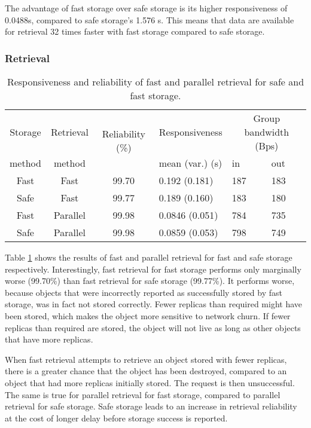 The advantage of fast storage over safe storage is its higher responsiveness of 0.0488s, compared to safe storage's 1.576 s. This means that data are available for retrieval 32 times faster with fast storage compared to safe storage.

\subsubsection{Retrieval}

\begin{table}[htbp]
\centering
\begin{tabular}{|c|c|c|l|l|l|}
\hline
Storage & Retrieval & \multirow{2}{*}{Reliability (\%)} & Responsiveness & \multicolumn{2}{c|}{Group bandwidth (Bps)} \\
\cline{5-6}
   method      &     method       &             &mean (var.) (s)& in&out\\
\hline
Fast           &   Fast           &   99.70    &  0.192 (0.181) & 187&183\\
Safe           &   Fast           &   99.77    &  0.189 (0.160) & 183&180\\
Fast           &   Parallel       &   99.98    &  0.0846 (0.051)& 784&735\\
Safe           &   Parallel       &   99.98    &  0.0859 (0.053)& 798&749\\
\hline
\end{tabular}
\caption{Responsiveness and reliability of fast and parallel retrieval for safe and fast storage.}
\label{tab_pithos_results}
\end{table}
%
Table \ref{tab_pithos_results} shows the results of fast and parallel retrieval for fast and safe storage respectively. Interestingly, fast retrieval for fast storage performs only marginally worse (99.70\%) than fast retrieval for safe storage (99.77\%). It performs worse, because objects that were incorrectly reported as successfully stored by fast storage, was in fact not stored correctly. Fewer replicas than required might have been stored, which makes the object more sensitive to network churn. If fewer replicas than required are stored, the object will not live as long as other objects that have more replicas.

When fast retrieval attempts to retrieve an object stored with fewer replicas, there is a greater chance that the object has been destroyed, compared to an object that had more replicas initially stored. The request is then unsuccessful. The same is true for parallel retrieval for fast storage, compared to parallel retrieval for safe storage. Safe storage leads to an increase in retrieval reliability at the cost of longer delay before storage success is reported.

